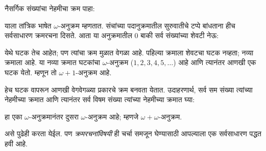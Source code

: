 नैसर्गिक संख्यांचा नेहमीचा क्रम पाहा:
\begin{center}
\end{center}
याला तांत्रिक भाषेत $\omega$-अनुक्रम म्हणतात. संचांच्या पदानुक्रमातील सुरुवातीचे टप्पे बांधताना हीच सर्वसाधारण क्रमरचना दिसते. आता या अनुक्रमातील $0$ बाकी सर्व संख्यांच्या शेवटी नेऊ:
\begin{center}
\end{center}
येथे घटक तेच आहेत; पण त्यांचा क्रम मुळात वेगळा आहे. पहिल्या क्रमाला शेवटचा घटक नव्हता; नव्या क्रमाला आहे. या नव्या क्रमात घटकांचा $\omega$-अनुक्रम ($1, 2, 3, 4, 5, \ldots$) आहे आणि त्यानंतर आणखी एक घटक येतो. म्हणून तो $\omega+1$-अनुक्रम आहे.

हेच घटक वापरून आणखी वेगवेगळ्या प्रकारचे क्रम बनवता येतात. उदाहरणार्थ, सर्व सम संख्या त्यांच्या नेहमीच्या क्रमात आणि त्यानंतर सर्व विषम संख्या त्यांच्या नेहमीच्या क्रमात घ्या:
\begin{center}
\end{center}
हा एका $\omega$-अनुक्रमानंतर दुसरा $\omega$-अनुक्रम आहे; म्हणजे $\omega+\omega$-अनुक्रम.

असे पुढेही करता येईल. पण \emph{क्रमरचनांविषयी} ही चर्चा समजून घेण्यासाठी आपल्याला एक सर्वसाधारण पद्धत हवी आहे.








